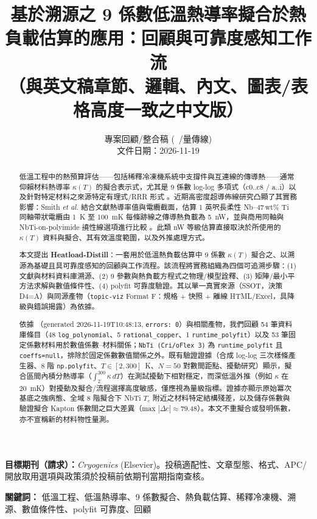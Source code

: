 \documentclass[11pt,a4paper]{article}
\title{基於溯源之 9 係數低溫熱導率擬合於熱負載估算的應用：回顧與可靠度感知工作流\\[4pt]\large （與英文稿章節、邏輯、內文、圖表/表格高度一致之中文版）}
\author{專案回顧/整合稿 (~/量傳線)\\文件日期：2026-11-19}
\date{}
\begin{document}
\maketitle

\noindent\textbf{目標期刊（請求）：}\textit{Cryogenics} (Elsevier)。投稿適配性、文章型態、格式、APC/開放取用選項與政策須於投稿前依期刊當期指南查核。

\begin{abstract}
低溫工程中的熱預算評估——包括稀釋冷凍機系統中支撐件與互連線的傳導熱——通常仰賴材料熱導率 $\kappa(T)$ 的擬合表示式，尤其是 9 係數 log-log 多項式（c0..c8 / a..i）以及針對特定材料之來源特定有理式/RRR 形式 \cite{nist,marquardt,bradley,simon1992,flynn,raicu2025}。近期高密度超導佈線研究凸顯了其實務影響：Smith \textit{et al.} 結合文獻熱導率值與電纜截面，估算 1 英呎長柔性 Nb--47\,wt\% Ti 同軸帶狀電纜由 1~K 至 100~mK 每條跡線之傳導熱負載為 5~nW，並與商用同軸與 NbTi-on-polyimide 撓性線選項進行比較 \cite{smith2024}。此類 nW 等級估算直接取決於所使用的 $\kappa(T)$ 資料與擬合、其有效溫度範圍，以及外推處理方式。

本文提出 \textbf{Heatload-Distill}：一套用於低溫熱負載估算中 9 係數 $\kappa(T)$ 擬合之、以溯源為基礎且具可靠度感知的回顧與工作流程。該流程將實務組織為四個可追溯步驟：(1) 文獻與材料資料庫溯源、(2) 9 參數與熱負載方程式之物理/模型詮釋、(3) 矩陣/最小平方法求解與數值條件性、(4) polyfit 可靠度驗證。其以單一真實來源（SSOT，決策 D4=A）與同源產物（\texttt{topic-viz} Format F：規格 + 快照 + 離線 HTML/Excel，具降級與錯誤揭露）為依據。

依據 （generated 2026-11-19T10:48:13, \texttt{errors: 0}）與相關產物，我們回顧 54 筆資料庫條目（48 \texttt{log\_polynomial}、5 \texttt{rational\_copper}、1 \texttt{runtime\_polyfit}）以及 53 筆固定係數材料用於數值係數--材料關係；\texttt{NbTi (Cri/oFlex 3)} 為 \texttt{runtime\_polyfit} 且 \texttt{coeffs=null}，排除於固定係數數值關係之外。既有驗證證據（合成 log-log 三次樣條產生器、8 階 \texttt{np.polyfit}、$T\in[2,300]$~K、$N=50$ 對數間距點、擾動研究）顯示，擬合區間內積分熱導率（$\int_{2}^{300}\kappa\,dT$）在測試擾動下相對穩定，而深低溫外推（例如 $\kappa$ 在 20~mK）對擾動及擬合/流程選擇高度敏感，僅應視為量級指標。證據亦顯示原始冪次基底之強病態、全域 8 階擬合下 NbTi $T_c$ 附近之材料特定結構殘差，以及儲存係數與驗證擬合 Kapton 係數間之巨大差異（max $|\Delta c|\approx 79.48$）。本文不重擬合或發明係數，亦不宣稱新的材料物性量測。
\end{abstract}

\noindent\textbf{關鍵詞：} 低溫工程、低溫熱導率、9 係數擬合、熱負載估算、稀釋冷凍機、溯源、數值條件性、polyfit 可靠度、回顧
\end{document}
